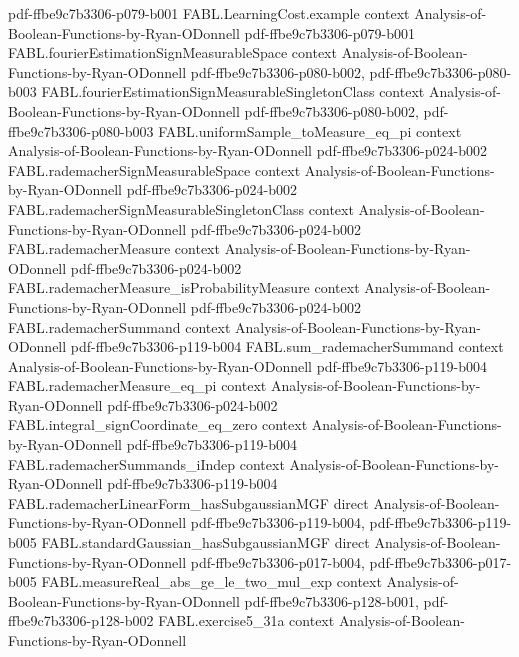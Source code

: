 \begin{theorem}
  {pdf-ffbe9c7b3306-p079-b001}
\proofstep
  {FABL.LearningCost.example}
  {context}
  {Analysis-of-Boolean-Functions-by-Ryan-ODonnell}
  {pdf-ffbe9c7b3306-p079-b001}
\proofstep
  {FABL.fourierEstimationSignMeasurableSpace}
  {context}
  {Analysis-of-Boolean-Functions-by-Ryan-ODonnell}
  {pdf-ffbe9c7b3306-p080-b002,
    pdf-ffbe9c7b3306-p080-b003}
\proofstep
  {FABL.fourierEstimationSignMeasurableSingletonClass}
  {context}
  {Analysis-of-Boolean-Functions-by-Ryan-ODonnell}
  {pdf-ffbe9c7b3306-p080-b002,
    pdf-ffbe9c7b3306-p080-b003}
\proofstep
  {FABL.uniformSample_toMeasure_eq_pi}
  {context}
  {Analysis-of-Boolean-Functions-by-Ryan-ODonnell}
  {pdf-ffbe9c7b3306-p024-b002}
\proofstep
  {FABL.rademacherSignMeasurableSpace}
  {context}
  {Analysis-of-Boolean-Functions-by-Ryan-ODonnell}
  {pdf-ffbe9c7b3306-p024-b002}
\proofstep
  {FABL.rademacherSignMeasurableSingletonClass}
  {context}
  {Analysis-of-Boolean-Functions-by-Ryan-ODonnell}
  {pdf-ffbe9c7b3306-p024-b002}
\proofstep
  {FABL.rademacherMeasure}
  {context}
  {Analysis-of-Boolean-Functions-by-Ryan-ODonnell}
  {pdf-ffbe9c7b3306-p024-b002}
\proofstep
  {FABL.rademacherMeasure_isProbabilityMeasure}
  {context}
  {Analysis-of-Boolean-Functions-by-Ryan-ODonnell}
  {pdf-ffbe9c7b3306-p024-b002}
\proofstep
  {FABL.rademacherSummand}
  {context}
  {Analysis-of-Boolean-Functions-by-Ryan-ODonnell}
  {pdf-ffbe9c7b3306-p119-b004}
\proofstep
  {FABL.sum_rademacherSummand}
  {context}
  {Analysis-of-Boolean-Functions-by-Ryan-ODonnell}
  {pdf-ffbe9c7b3306-p119-b004}
\proofstep
  {FABL.rademacherMeasure_eq_pi}
  {context}
  {Analysis-of-Boolean-Functions-by-Ryan-ODonnell}
  {pdf-ffbe9c7b3306-p024-b002}
\proofstep
  {FABL.integral_signCoordinate_eq_zero}
  {context}
  {Analysis-of-Boolean-Functions-by-Ryan-ODonnell}
  {pdf-ffbe9c7b3306-p119-b004}
\proofstep
  {FABL.rademacherSummands_iIndep}
  {context}
  {Analysis-of-Boolean-Functions-by-Ryan-ODonnell}
  {pdf-ffbe9c7b3306-p119-b004}
\proofstep
  {FABL.rademacherLinearForm_hasSubgaussianMGF}
  {direct}
  {Analysis-of-Boolean-Functions-by-Ryan-ODonnell}
  {pdf-ffbe9c7b3306-p119-b004,
    pdf-ffbe9c7b3306-p119-b005}
\proofstep
  {FABL.standardGaussian_hasSubgaussianMGF}
  {direct}
  {Analysis-of-Boolean-Functions-by-Ryan-ODonnell}
  {pdf-ffbe9c7b3306-p017-b004,
    pdf-ffbe9c7b3306-p017-b005}
\proofstep
  {FABL.measureReal_abs_ge_le_two_mul_exp}
  {context}
  {Analysis-of-Boolean-Functions-by-Ryan-ODonnell}
  {pdf-ffbe9c7b3306-p128-b001,
    pdf-ffbe9c7b3306-p128-b002}
\proofstep
  {FABL.exercise5_31a}
  {context}
  {Analysis-of-Boolean-Functions-by-Ryan-ODonnell}

\end{theorem}
